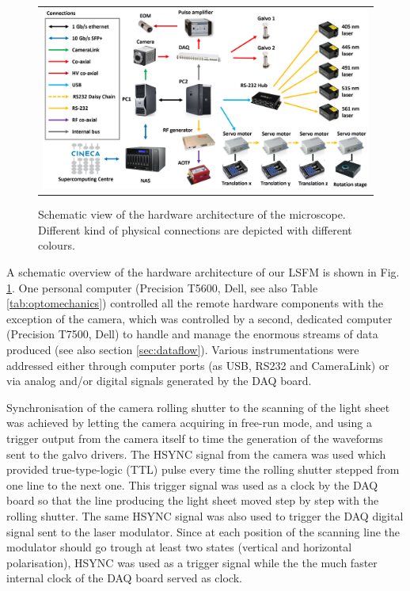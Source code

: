 \documentclass[12pt]{spieman}  %
\begin{document}
\begin{spacing}{2}
	\begin{figure}
   \begin{center}
   \begin{tabular}{c}
   \includegraphics[width=\textwidth]{panel4.eps}
   \end{tabular}
   \end{center}
   \caption{\label{fig:connectivity} Schematic view of the hardware architecture of the microscope. Different kind of physical connections are depicted with different colours.} 
   \end{figure}

A schematic overview of the hardware architecture of our LSFM is shown in Fig. \ref{fig:connectivity}. One personal computer (Precision T5600, Dell, see also Table \ref{tab:optomechanics}) controlled all the remote hardware components with the exception of the camera, which was controlled by a second, dedicated computer (Precision T7500, Dell) to handle and manage the enormous streams of data produced (see also section \ref{sec:dataflow}). Various instrumentations were addressed either through computer ports (as USB, RS232 and CameraLink) or via analog and/or digital signals generated by the DAQ board.

Synchronisation of the camera rolling shutter to the scanning of the light sheet was achieved by letting the camera acquiring in free-run mode, and using a trigger output from the camera itself to time the generation of the waveforms sent to the galvo drivers. The HSYNC signal from the camera was used which provided true-type-logic (TTL) pulse every time the rolling shutter stepped from one line to the next one. This trigger signal was used as a clock by the DAQ board so that the line producing the light sheet moved step by step with the rolling shutter. The same HSYNC signal was also used to trigger the DAQ digital signal sent to the laser modulator. Since at each position of the scanning line the modulator should go trough at least two states (vertical and horizontal polarisation), HSYNC was used as a trigger signal while the the much faster internal clock of the DAQ board served as clock.




\end{spacing}
\end{document}
